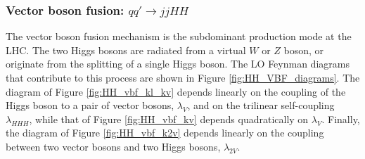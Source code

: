 \subsubsection{Vector boson fusion: $qq'\rightarrow jjHH$}
%
The vector boson fusion mechanism is the subdominant production mode at the LHC. The two Higgs bosons are radiated from a virtual $W$ or $Z$ boson, or originate from the splitting of a single Higgs boson. The LO Feynman diagrams that contribute to this process are shown in Figure \ref{fig:HH_VBF_diagrams}. The diagram of Figure \ref{fig:HH_vbf_kl_kv} depends linearly on the coupling of the Higgs boson to a pair of vector bosons, $\lambda_V$, and on the trilinear self-coupling $\lambda_{HHH}$, while that of Figure \ref{fig:HH_vbf_kv} depends quadratically on $\lambda_V$. Finally, the diagram of Figure \ref{fig:HH_vbf_k2v} depends linearly on the coupling between two vector bosons and two Higgs bosons, $\lambda_{2V}$.
%
